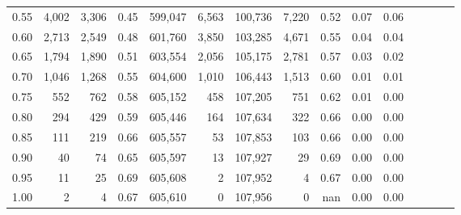 \begin{tabular}{rrrcrrrrrrrrrrr}
0.55 &    4,002 &   3,306 &                                       0.45 &  599,047 &    6,563 &  100,736 &    7,220 &  0.52 &  0.07 &                         0.06 \\
0.60 &    2,713 &   2,549 &                                       0.48 &  601,760 &    3,850 &  103,285 &    4,671 &  0.55 &  0.04 &                         0.04 \\
0.65 &    1,794 &   1,890 &                                       0.51 &  603,554 &    2,056 &  105,175 &    2,781 &  0.57 &  0.03 &                         0.02 \\
0.70 &    1,046 &   1,268 &                                       0.55 &  604,600 &    1,010 &  106,443 &    1,513 &  0.60 &  0.01 &                         0.01 \\
0.75 &      552 &     762 &                                       0.58 &  605,152 &      458 &  107,205 &      751 &  0.62 &  0.01 &                         0.00 \\
0.80 &      294 &     429 &                                       0.59 &  605,446 &      164 &  107,634 &      322 &  0.66 &  0.00 &                         0.00 \\
0.85 &      111 &     219 &                                       0.66 &  605,557 &       53 &  107,853 &      103 &  0.66 &  0.00 &                         0.00 \\
0.90 &       40 &      74 &                                       0.65 &  605,597 &       13 &  107,927 &       29 &  0.69 &  0.00 &                         0.00 \\
0.95 &       11 &      25 &                                       0.69 &  605,608 &        2 &  107,952 &        4 &  0.67 &  0.00 &                         0.00 \\
1.00 &        2 &       4 &                                       0.67 &  605,610 &        0 &  107,956 &        0 &   nan &  0.00 &                         0.00 \\
\bottomrule
\end{tabular}
